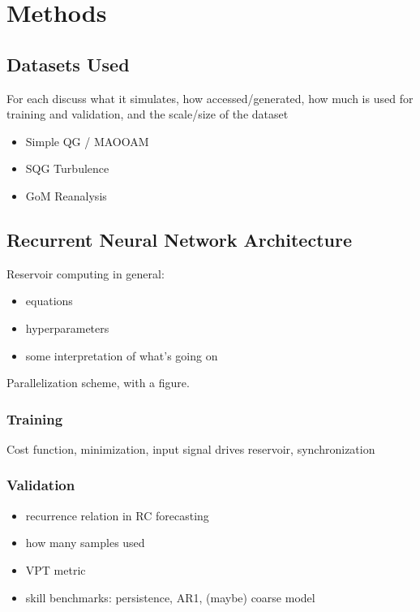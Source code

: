 \section{Methods}
\label{sec:methods}

\subsection{Datasets Used}
\label{subsec:datasets}

For each discuss what it simulates, how accessed/generated, how much is used for
training and validation, and the scale/size of the dataset
\begin{itemize}
    \item Simple QG / MAOOAM
    \item SQG Turbulence
    \item GoM Reanalysis
\end{itemize}


\subsection{Recurrent Neural Network Architecture}
\label{subsec:rnn-architecture}

Reservoir computing in general:
\begin{itemize}
    \item equations
    \item hyperparameters
    \item some interpretation of what's going on
\end{itemize}

Parallelization scheme, with a figure.

\subsubsection{Training}
\label{subsubsec:training}

Cost function, minimization, input signal drives reservoir, synchronization

\subsubsection{Validation}
\label{subsubsec:validation}

\begin{itemize}
    \item recurrence relation in RC forecasting
    \item how many samples used
    \item VPT metric
    \item skill benchmarks: persistence, AR1, (maybe) coarse model
\end{itemize}
